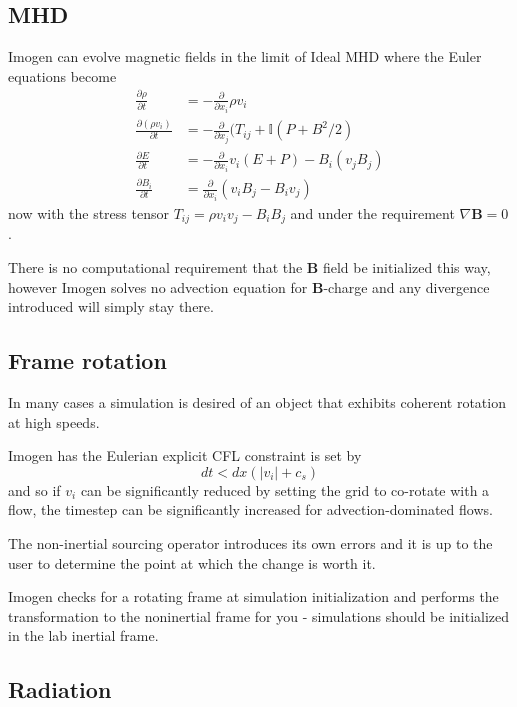 \documentclass[letterpaper,12pt,twocolumn]{article}
\begin{document}
\subsection{MHD}

Imogen can evolve magnetic fields in the limit of Ideal MHD where the Euler equations
become
\begin{align*}
\frac{\partial \rho}{\partial t} &= -\frac{\partial}{\partial x_i} \rho v_i \\
\frac{\partial (\rho v_i)}{\partial t} &= -\frac{\partial}{\partial x_j} (T_{ij} + \mathbb{I}(P+B^2/2) \\
\frac{\partial E}{\partial t} &= -\frac{\partial}{\partial x_i} v_i (E + P) - B_i (v_j B_j) \\
\frac{\partial B_i}{\partial t} &= \frac{\partial}{\partial x_i} (v_i B_j - B_i v_j)
\end{align*}
now with the stress tensor $T_{ij} = \rho v_i v_j - B_i B_j$ and under the requirement
$\nabla \mathbf{B} = 0$.

There is no computational requirement that the \textbf{B} field be initialized this way,
however Imogen solves no advection equation for $\mathbf{B}$-charge and any divergence
introduced will simply stay there.

\subsection{Frame rotation}

In many cases a simulation is desired of an object that exhibits coherent rotation at
high speeds.

Imogen has the Eulerian explicit CFL constraint is set by
\[ dt < dx (|v_i| + c_s) \]
and so if $v_i$ can be significantly reduced by setting the grid to co-rotate with a flow,
the timestep can be significantly increased for advection-dominated flows.

The non-inertial sourcing operator introduces its own errors and it is up to the user to
determine the point at which the change is worth it.

Imogen checks for a rotating frame at simulation initialization and performs the
transformation to the noninertial frame for you - simulations should be initialized
in the lab inertial frame.

\subsection{Radiation}
\end{document}
